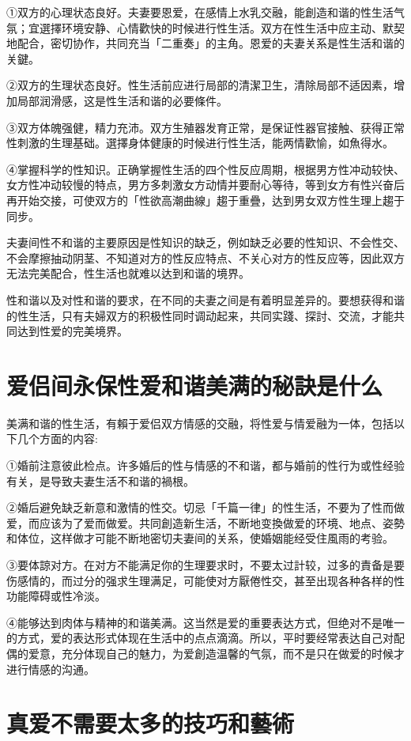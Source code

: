 \documentclass[12pt,UTF8]{ctexbook}
\begin{document}
①双方的心理状态良好。夫妻要恩爱，在感情上水乳交融，能創造和谐的性生活气氛；宜選擇环境安静、心情歡快的时候进行性生活。双方在性生活中应主动、默契地配合，密切协作，共同充当「二重奏」的主角。恩爱的夫妻关系是性生活和谐的关鍵。

②双方的生理状态良好。性生活前应进行局部的清潔卫生，清除局部不适因素，增加局部润滑感，这是性生活和谐的必要條件。

③双方体魄强健，精力充沛。双方生殖器发育正常，是保证性器官接触、获得正常性刺激的生理基础。選擇身体健康的时候进行性生活，能两情歡愉，如魚得水。

④掌握科学的性知识。正确掌握性生活的四个性反应周期，根据男方性冲动较快、女方性冲动较慢的特点，男方多刺激女方动情并要耐心等待，等到女方有性兴奋后再开始交接，可使双方的「性欲高潮曲線」趨于重疊，达到男女双方性生理上趨于同步。

夫妻间性不和谐的主要原因是性知识的缺乏，例如缺乏必要的性知识、不会性交、不会摩擦抽动阴茎、不知道对方的性反应特点、不关心对方的性反应等，因此双方无法完美配合，性生活也就难以达到和谐的境界。

性和谐以及对性和谐的要求，在不同的夫妻之间是有着明显差异的。要想获得和谐的性生活，只有夫婦双方的积极性同时调动起来，共同实踐、探討、交流，才能共同达到性爱的完美境界。

\section{爱侣间永保性爱和谐美满的秘訣是什么}

美满和谐的性生活，有賴于爱侣双方情感的交融，将性爱与情爱融为一体，包括以下几个方面的内容:

①婚前注意彼此检点。许多婚后的性与情感的不和谐，都与婚前的性行为或性经验有关，是导致夫妻生活不和谐的禍根。

②婚后避免缺乏新意和激情的性交。切忌「千篇一律」的性生活，不要为了性而做爱，而应该为了爱而做爱。共同創造新生活，不断地变換做爱的环境、地点、姿勢和体位，这样做才可能不断地密切夫妻间的关系，使婚姻能经受住風雨的考验。

③要体諒对方。在对方不能满足你的生理要求时，不要太过計较，过多的責备是要伤感情的，而过分的强求生理满足，可能使对方厭倦性交，甚至出现各种各样的性功能障碍或性冷淡。

④能够达到肉体与精神的和谐美满。这当然是爱的重要表达方式，但绝对不是唯一的方式，爱的表达形式体现在生活中的点点滴滴。所以，平时要经常表达自己对配偶的爱意，充分体现自己的魅力，为爱創造温馨的气氛，而不是只在做爱的时候才进行情感的沟通。

\section{真爱不需要太多的技巧和藝術}
\end{document}
